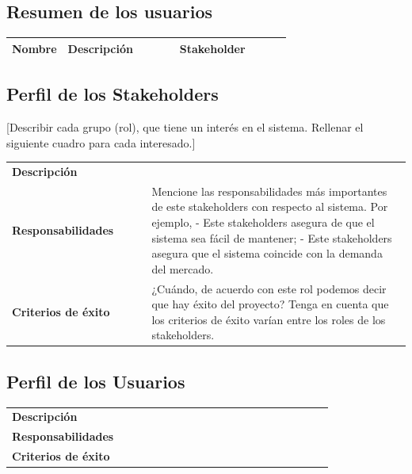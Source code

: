 \documentclass[11pt]{article}
\begin{document}
\subsection{Resumen de los usuarios}
\begin{table}[H]
  \centering
  \begin{tabular}{p{0.2\linewidth}p{0.4\linewidth}p{0.4\linewidth}}
    \toprule
    \textbf{Nombre} & \textbf{Descripción} & \textbf{Stakeholder} \\
    \midrule
    \bottomrule
  \end{tabular}
\end{table}

\subsection{Perfil de los Stakeholders}
[Describir cada grupo (rol), que tiene un interés en el sistema. Rellenar el siguiente cuadro para cada interesado.]

\begin{table}[H]
  \centering
  \begin{tabular}{p{0.35\linewidth}|p{0.65\linewidth}}
    \toprule
    \textbf{Descripción} &\\
    \textbf{Responsabilidades} & Mencione las responsabilidades más importantes de este stakeholders con respecto al sistema. Por ejemplo,
- Este stakeholders asegura de que el sistema sea fácil de mantener;
- Este stakeholders asegura que el sistema coincide con la demanda del mercado. \\
    \textbf{Criterios de éxito} & ¿Cuándo, de acuerdo con este rol podemos decir que hay éxito del proyecto? Tenga en cuenta que los criterios de éxito varían entre los roles de los stakeholders. \\
    \bottomrule
  \end{tabular}
\end{table}

\subsection{Perfil de los Usuarios}
\begin{table}[H]
  \centering
  \begin{tabular}{p{0.35\linewidth}|p{0.65\linewidth}}
    \toprule
    \textbf{Descripción} &\\
    \textbf{Responsabilidades} &  \\
    \textbf{Criterios de éxito} &  \\
    \bottomrule
  \end{tabular}
\end{table}
\end{document}
